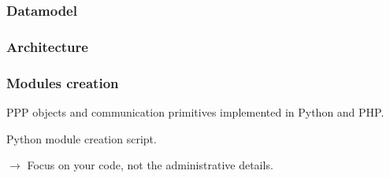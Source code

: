 \begin{frame}[fragile]
    \frametitle{Datamodel}
\end{frame}

\begin{frame}[fragile]
    \frametitle{Architecture}
    \begin{figure}
        \resizebox{.9\linewidth}{!}{
            
        }
    \end{figure}
\end{frame}

\begin{frame}[fragile]
    \frametitle{Modules creation}
    PPP objects and communication primitives implemented in Python and PHP.

    Python module creation script.

    $\rightarrow$ Focus on your code, not the administrative details.
\end{frame}
